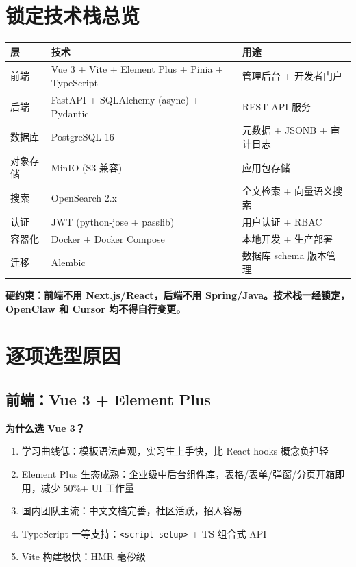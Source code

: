 \documentclass[11pt,a4paper]{article}
\begin{document}
\section{锁定技术栈总览}

\begin{table}[h]
\centering
\begin{tabular}{llp{5.5cm}}
\toprule
\textbf{层} & \textbf{技术} & \textbf{用途} \\
\midrule
前端 & Vue 3 + Vite + Element Plus + Pinia + TypeScript & 管理后台 + 开发者门户 \\
后端 & FastAPI + SQLAlchemy (async) + Pydantic & REST API 服务 \\
数据库 & PostgreSQL 16 & 元数据 + JSONB + 审计日志 \\
对象存储 & MinIO (S3 兼容) & 应用包存储 \\
搜索 & OpenSearch 2.x & 全文检索 + 向量语义搜索 \\
认证 & JWT (python-jose + passlib) & 用户认证 + RBAC \\
容器化 & Docker + Docker Compose & 本地开发 + 生产部署 \\
迁移 & Alembic & 数据库 schema 版本管理 \\
\bottomrule
\end{tabular}
\end{table}

\textbf{硬约束：前端不用 Next.js/React，后端不用 Spring/Java。技术栈一经锁定，OpenClaw 和 Cursor 均不得自行变更。}

\section{逐项选型原因}

\subsection{前端：Vue 3 + Element Plus}

\textbf{为什么选 Vue 3？}

\begin{enumerate}[nosep]
  \item 学习曲线低：模板语法直观，实习生上手快，比 React hooks 概念负担轻
  \item Element Plus 生态成熟：企业级中后台组件库，表格/表单/弹窗/分页开箱即用，减少 50\%+ UI 工作量
  \item 国内团队主流：中文文档完善，社区活跃，招人容易
  \item TypeScript 一等支持：\texttt{<script setup>} + TS 组合式 API
  \item Vite 构建极快：HMR 毫秒级
\end{enumerate}
\end{document}
